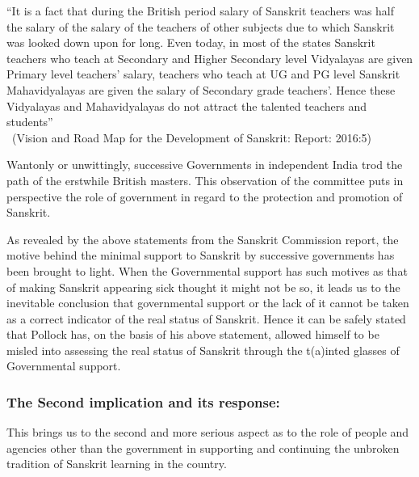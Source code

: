 \begin{myquote}
\eleven
“It is a fact that during the British period salary of Sanskrit teachers was half the salary of the salary of the teachers of other subjects due to which Sanskrit was looked down upon for long. Even today, in most of the states Sanskrit teachers who teach at Secondary and Higher Secondary level Vidyalayas are given Primary level teachers’ salary, teachers who teach at UG and PG level Sanskrit Mahavidyalayas are given the salary of Secondary grade teachers’. Hence these Vidyalayas and Mahavidyalayas do not attract the talented teachers and students”\\[-15pt]  

~\hfill(Vision and Road Map for the Development of Sanskrit: Report: 2016:5) 
\end{myquote}

Wantonly or unwittingly, successive Governments in independent India trod the path of the erstwhile British masters. This observation of the committee puts in perspective the role of government in regard to the protection and promotion of Sanskrit. 

As revealed by the above statements from the Sanskrit Commission report, the motive behind the minimal support to Sanskrit by successive governments has been brought to light. When the Governmental support has such motives as that of making Sanskrit appearing sick thought it might not be so, it leads us to the inevitable conclusion that  governmental support or the lack of it cannot be taken as a correct indicator of the real status of Sanskrit. Hence it can be safely stated that Pollock has, on the basis of his above statement, allowed himself to be misled into assessing the real status of Sanskrit through the t(a)inted glasses of Governmental support.

\subsubsection{The Second implication and its response:}

This brings us to the second and more serious aspect as to the role of people and agencies other than the government in supporting and continuing the unbroken tradition of Sanskrit learning in the country.

